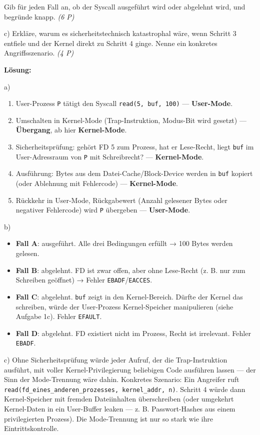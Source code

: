 \documentclass[11pt, a4paper]{article}
\begin{document}
Gib für jeden Fall an, ob der Syscall ausgeführt wird oder abgelehnt wird, und begründe knapp. \textit{(6 P)}


c) Erkläre, warum es sicherheitstechnisch katastrophal wäre, wenn Schritt 3 entfiele und der Kernel direkt zu Schritt 4 ginge. Nenne ein konkretes Angriffsszenario. \textit{(4 P)}


\textbf{Lösung:}


a)

\begin{enumerate}
  \item User-Prozess \texttt{P} tätigt den Syscall \texttt{read(5, buf, 100)} — \textbf{User-Mode}.
  \item Umschalten in Kernel-Mode (Trap-Instruktion, Modus-Bit wird gesetzt) — \textbf{Übergang}, ab hier \textbf{Kernel-Mode}.
  \item Sicherheitsprüfung: gehört FD 5 zum Prozess, hat er Lese-Recht, liegt \texttt{buf} im User-Adressraum von \texttt{P} mit Schreibrecht? — \textbf{Kernel-Mode}.
  \item Ausführung: Bytes aus dem Datei-Cache/Block-Device werden in \texttt{buf} kopiert (oder Ablehnung mit Fehlercode) — \textbf{Kernel-Mode}.
  \item Rückkehr in User-Mode, Rückgabewert (Anzahl gelesener Bytes oder negativer Fehlercode) wird \texttt{P} übergeben — \textbf{User-Mode}.
\end{enumerate}

b)

\begin{itemize}
  \item \textbf{Fall A}: ausgeführt. Alle drei Bedingungen erfüllt → 100 Bytes werden gelesen.
  \item \textbf{Fall B}: abgelehnt. FD ist zwar offen, aber ohne Lese-Recht (z. B. nur zum Schreiben geöffnet) → Fehler \texttt{EBADF}/\texttt{EACCES}.
  \item \textbf{Fall C}: abgelehnt. \texttt{buf} zeigt in den Kernel-Bereich. Dürfte der Kernel das schreiben, würde der User-Prozess Kernel-Speicher manipulieren (siehe Aufgabe 1c). Fehler \texttt{EFAULT}.
  \item \textbf{Fall D}: abgelehnt. FD existiert nicht im Prozess, Recht ist irrelevant. Fehler \texttt{EBADF}.
\end{itemize}

c) Ohne Sicherheitsprüfung würde jeder Aufruf, der die Trap-Instruktion ausführt, mit voller Kernel-Privilegierung beliebigen Code ausführen lassen — der Sinn der Mode-Trennung wäre dahin. Konkretes Szenario: Ein Angreifer ruft \texttt{read(fd\_eines\_anderen\_prozesses, kernel\_addr, n)}. Schritt 4 würde dann Kernel-Speicher mit fremden Dateiinhalten überschreiben (oder umgekehrt Kernel-Daten in ein User-Buffer leaken — z. B. Passwort-Hashes aus einem privilegierten Prozess). Die Mode-Trennung ist nur so stark wie ihre Eintrittskontrolle.
\end{document}
